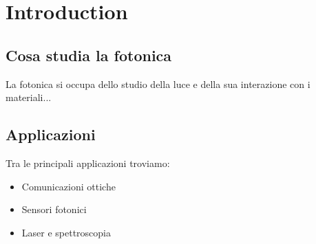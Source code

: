 \chapter{Introduction}

\section{Cosa studia la fotonica}
La fotonica si occupa dello studio della luce e della sua interazione con i materiali...

\section{Applicazioni}
Tra le principali applicazioni troviamo:
\begin{itemize}
    \item Comunicazioni ottiche
    \item Sensori fotonici
    \item Laser e spettroscopia
\end{itemize}

